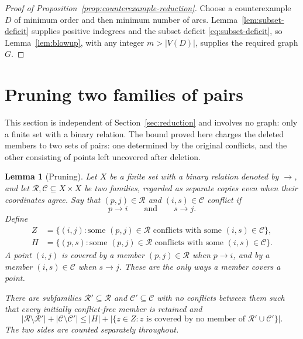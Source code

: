 \documentclass[11pt]{article}
\newtheorem{lemma}[theorem]{Lemma}
\theoremstyle{remark}
\newcommand{\abs}[1]{\lvert #1\rvert}
\begin{document}
\begin{proof}[Proof of Proposition~\ref{prop:counterexample-reduction}]
Choose a counterexample $D$ of minimum order and then minimum number of
arcs. Lemma~\ref{lem:subset-deficit} supplies positive indegrees and
the subset deficit \eqref{eq:subset-deficit}, so Lemma~\ref{lem:blowup},
with any integer $m>\abs{V(D)}$, supplies the required graph $G$.
\end{proof}

\section{Pruning two families of pairs}\label{sec:pruning}

This section is independent of Section~\ref{sec:reduction} and involves no
graph: only a finite set with a binary relation. The bound proved here
charges the deleted members to two sets of pairs: one determined by the
original conflicts, and the other consisting of points left uncovered after
deletion.

\begin{lemma}[Pruning]\label{lem:pruning}
Let $X$ be a finite set with a binary relation denoted by $\to$, and let
$\mathcal R,\mathcal C\subseteq X\times X$ be two families, regarded as
separate copies even when their coordinates agree. Say that
$(p,j)\in\mathcal R$ and $(i,s)\in\mathcal C$ \emph{conflict} if
\[
 p\to i\qquad\text{and}\qquad s\to j.
\]
Define
\begin{align*}
 Z&=\{(i,j):\text{some }(p,j)\in\mathcal R
       \text{ conflicts with some }(i,s)\in\mathcal C\},\\
 H&=\{(p,s):\text{some }(p,j)\in\mathcal R
       \text{ conflicts with some }(i,s)\in\mathcal C\}.
\end{align*}
A point $(i,j)$ is \emph{covered} by a member $(p,j)\in\mathcal R$ when
$p\to i$, and by a member $(i,s)\in\mathcal C$ when $s\to j$.
These are the only ways a member covers a point.

There are subfamilies $\mathcal R'\subseteq\mathcal R$ and
$\mathcal C'\subseteq\mathcal C$ with no conflicts between them such that
every initially conflict-free member is retained and
\begin{equation}\label{eq:pruning-bound}
 \abs{\mathcal R\setminus\mathcal R'}+
 \abs{\mathcal C\setminus\mathcal C'}
 \leq \abs H+
 \abs{\{z\in Z:z\text{ is covered by no member of }
                    \mathcal R'\cup\mathcal C'\}}.
\end{equation}
The two sides are counted separately throughout.
\end{lemma}
\end{document}
